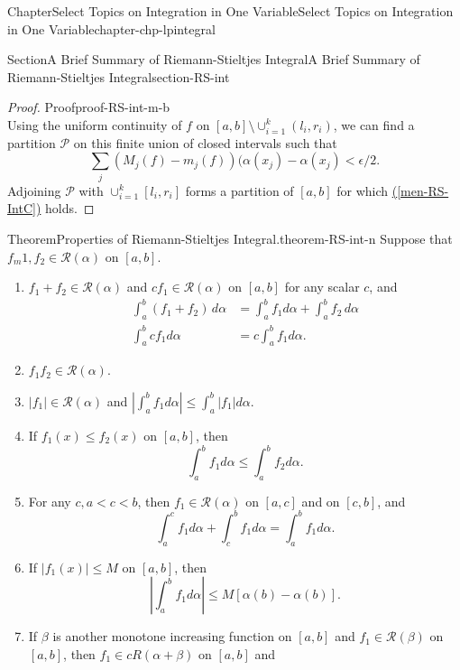 \documentclass[oneside,10pt,]{book}
\newcommand{\xreffont}{\relax}
\numberwithin{equation}{section}
\newcommand{\cP}{\mathcal{P}}
\newcommand{\cR}{\mathcal{R}}
\newcommand{\amp}{&}
\begin{document}
\begin{chapterptx}{Chapter}{Select Topics on Integration in One Variable}{}{Select Topics on Integration in One Variable}{}{}{chapter-chp-lpintegral}
\begin{sectionptx}{Section}{A Brief Summary of Riemann-Stieltjes Integral}{}{A Brief Summary of Riemann-Stieltjes Integral}{}{}{section-RS-int}
\begin{proof}{Proof}{}{proof-RS-int-m-b}
\begin{equation*}
\end{equation*}
Using the uniform continuity of \(f\) on \([a, b]\setminus \cup_{i=1}^{k} (l_{i}, r_{i})\), we can find a partition \(\cP\) on this finite union of closed intervals such that%
\begin{equation*}
\sum_{j} \left(M_{j}(f)-m_{j}(f)\right) (\alpha(x_{j})-\alpha(x_{j}) < \epsilon/2.
\end{equation*}
Adjoining \(\cP\) with \(\cup_{i=1}^{k} [l_{i}, r_{i}]\) forms a partition of \([a, b]\) for which \hyperref[men-RS-IntC]{({\xreffont\ref{men-RS-IntC}})} holds.\end{proof}
\begin{theorem}{Theorem}{Properties of Riemann-Stieltjes Integral.}{}{theorem-RS-int-n}%
Suppose that \(f_m{1}, f_{2} \in \cR(\alpha)\) on \([a,  b]\). %
\begin{enumerate}[label=(\alph*)]
\item{}\(f_{1}+f_{2} \in \cR(\alpha)\) and \(c f_{1}  \in \cR(\alpha)\) on \([a,  b]\) for any scalar \(c\), and%
\begin{align*}
\int_{a}^{b} (f_{1}+f_{2})\, d\alpha \amp= \int_{a}^{b} f_{1} d\alpha +\int_{a}^{b} f_{2}\, d\alpha\\
\int_{a}^{b}c f_{1} d\alpha \amp= c  \int_{a}^{b} f_{1} d\alpha.
\end{align*}
%
\item{}\(f_{1} f_{2} \in \cR(\alpha)\).%
\item{}\(|f_{1}| \in \cR(\alpha)\) and \(\left| \int_{a}^{b} f_{1} d\alpha\right|
\le \int_{a}^{b} |f_{1}| d\alpha\).%
\item{}If \(f_{1}(x)\le f_{2}(x)\) on \([a, b]\), then%
\begin{equation*}
\int_{a}^{b} f_{1} d\alpha \le  \int_{a}^{b} f_{2} d\alpha.
\end{equation*}
%
\item{}For any \(c, a < c < b\), then \(f_{1}\in \cR(\alpha)\) on \([a, c]\) and on \([c, b]\), and%
\begin{equation*}
\int_{a}^{c} f_{1} d\alpha +  \int_{c}^{b} f_{1} d\alpha =  \int_{a}^{b} f_{1} d\alpha.
\end{equation*}
%
\item{}If \(|f_{1}(x)|\le M\) on \([a, b]\), then%
\begin{equation*}
\left|  \int_{a}^{b} f_{1} d\alpha \right|\le M[\alpha(b)-\alpha(b)].
\end{equation*}
%
\item{}If \(\beta\) is another monotone increasing function on \([a, b]\) and \(f_{1} \in \cR(\beta)\) on \([a, b]\), then \(f_{1} \in cR(\alpha +\beta)\) on \([a, b]\) and%

\end{enumerate}
\end{theorem}
\end{sectionptx}
\end{chapterptx}
\end{document}
